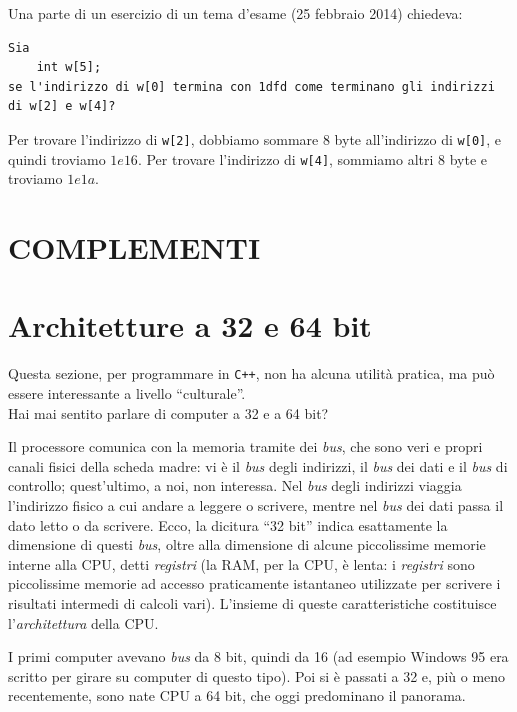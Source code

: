 	Una parte di un esercizio di un tema d'esame (25 febbraio 2014) chiedeva:
\begin{shaded}
\begin{verbatim}
Sia 
    int w[5];
se l'indirizzo di w[0] termina con 1dfd come terminano gli indirizzi 
di w[2] e w[4]?	
\end{verbatim}
\end{shaded}
Per trovare l'indirizzo di \verb|w[2]|, dobbiamo sommare 8 byte all'indirizzo di \verb|w[0]|, e quindi troviamo $1e16$. Per trovare l'indirizzo di \verb|w[4]|, sommiamo altri 8 byte e troviamo $1e1a$.
\begin{subappendices}
	\section*{COMPLEMENTI}
\section{Architetture a 32 e 64 bit}\label{archCPU}
Questa sezione, per programmare in \verb|C++|, non ha alcuna utilità  pratica, ma può essere interessante a livello ``culturale''.\\

Hai mai sentito parlare di computer a 32 e a 64 bit? 

Il processore comunica con la memoria tramite dei \emph{bus}, che sono veri e propri canali fisici della scheda madre: vi è il \emph{bus} degli indirizzi, il \emph{bus} dei dati e il \emph{bus} di controllo; quest'ultimo, a noi, non interessa. Nel \emph{bus} degli indirizzi viaggia l'indirizzo fisico a cui andare a leggere o scrivere, mentre nel \emph{bus} dei dati passa il dato letto o da scrivere. Ecco, la dicitura ``32 bit'' indica esattamente la dimensione di questi \emph{bus}, oltre alla dimensione di alcune piccolissime memorie interne alla CPU, detti \emph{registri} (la RAM, per la CPU, è lenta: i \emph{registri} sono piccolissime memorie ad accesso praticamente istantaneo utilizzate per scrivere i risultati intermedi di calcoli vari). L'insieme di queste caratteristiche costituisce l'\emph{architettura} della CPU. 

I primi computer avevano \emph{bus} da 8 bit, quindi da 16 (ad esempio Windows 95 era scritto per girare su computer di questo tipo). Poi si è passati a 32 e, più o meno recentemente, sono nate CPU a 64 bit, che oggi predominano il panorama.


\end{subappendices}
